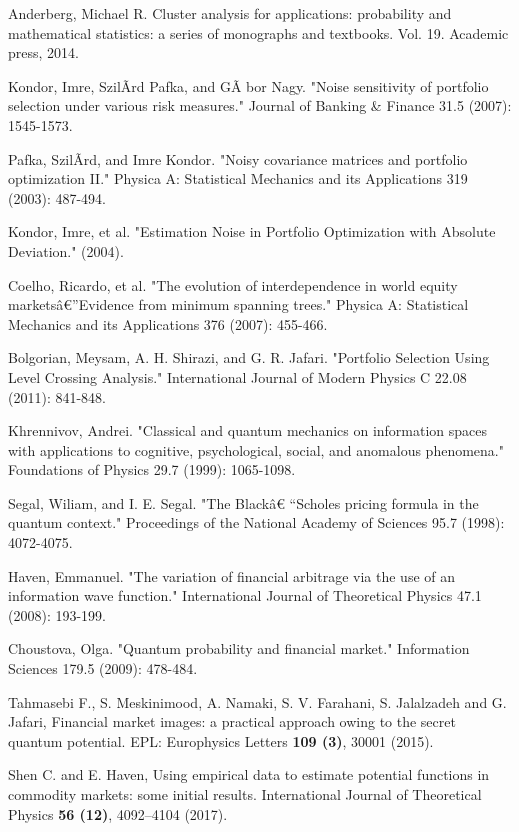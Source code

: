 \documentclass[ aip,jmp,reprint]{revtex4-2}
\begin{document}
\begin{thebibliography}{99}
 Anderberg, Michael R. Cluster analysis for applications:
probability and mathematical statistics: a series of monographs and
textbooks. Vol. 19. Academic press, 2014.

 Kondor, Imre, Szil\~{A}\textexclamdown rd Pafka, and G\~{A}%
\textexclamdown bor Nagy. "Noise sensitivity of portfolio selection under
various risk measures." Journal of Banking \& Finance 31.5 (2007): 1545-1573.

 Pafka, Szil\~{A}\textexclamdown rd, and Imre Kondor. "Noisy
covariance matrices and portfolio optimization II." Physica A: Statistical
Mechanics and its Applications 319 (2003): 487-494.

 Kondor, Imre, et al. "Estimation Noise in Portfolio
Optimization with Absolute Deviation." (2004).

 Coelho, Ricardo, et al. "The evolution of interdependence
in world equity markets\^{a}\euro ''Evidence from minimum spanning trees."
Physica A: Statistical Mechanics and its Applications 376 (2007): 455-466.

 Bolgorian, Meysam, A. H. Shirazi, and G. R. Jafari.
"Portfolio Selection Using Level Crossing Analysis." International Journal
of Modern Physics C 22.08 (2011): 841-848.


 Khrennivov, Andrei. "Classical and quantum mechanics
on information spaces with applications to cognitive, psychological, social,
and anomalous phenomena." Foundations of Physics 29.7 (1999): 1065-1098.

 Segal, Wiliam, and I. E. Segal. "The Black\^{a}\euro
``Scholes pricing formula in the quantum context." Proceedings of the
National Academy of Sciences 95.7 (1998): 4072-4075.

 Haven, Emmanuel. "The variation of financial arbitrage via
the use of an information wave function." International Journal of
Theoretical Physics 47.1 (2008): 193-199.

 Choustova, Olga. "Quantum probability and financial
market." Information Sciences 179.5 (2009): 478-484.

 Tahmasebi F., S. Meskinimood, A. Namaki, S. V. Farahani,
S. Jalalzadeh and G. Jafari, Financial market images: a practical approach
owing to the secret quantum potential. EPL: Europhysics Letters \textbf{109
(3)}, 30001 (2015).

 Shen C. and E. Haven, Using empirical data to estimate
potential functions in commodity markets: some initial results.
International Journal of Theoretical Physics \textbf{56 (12)}, 4092--4104
(2017).


\end{thebibliography}
\end{document}
